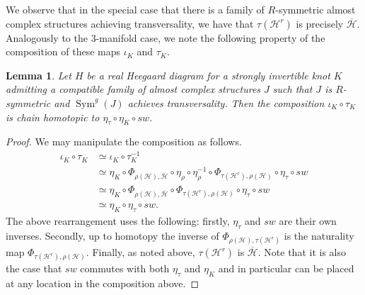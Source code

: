 \documentclass[11pt,reqno]{amsart}
\newtheorem{lem}[thm]{Lemma}
\theoremstyle{definition}
\theoremstyle{remark}
\DeclareMathOperator{\Sym}{{Sym}}
\newcommand{\cH}{\mathcal{H}}
\numberwithin{equation}{section}
\begin{document}
We observe that in the special case that there is a family of $R$-symmetric almost complex structures achieving transversality, we have that $\tau(\cH^r)$ is precisely $\overline{\cH}$. Analogously to the 3-manifold case, we note the following property of the composition of these maps $\iota_K$ and $\tau_K$. 
%
\begin{lem} \label{lem:iotaKtauK} Let $H$ be a real Heegaard diagram for a strongly invertible knot $K$ admitting a compatible family of almost complex structures $J$ such that $J$ is $R$-symmetric and $\Sym^g(J)$ achieves transversality. Then the composition $\iota_K \circ \tau_K$ is chain homotopic to $\eta_{\tau} \circ \eta_K \circ sw$. \end{lem}
\begin{proof} We may manipulate the composition as follows.
%
\begin{align*} 
\iota_K \circ \tau_K &\simeq \iota_K \circ \tau_K^{-1} \\
						&\simeq \eta_K \circ \Phi_{\rho(\cH), \overline{\cH}} \circ \eta_{\rho} \circ \eta_{\rho}^{-1} \circ \Phi_{\tau(\cH^r), \rho(\cH)} \circ \eta_{\tau} \circ sw \\
						&\simeq \eta_K \circ \Phi_{\rho(\cH), \overline{\cH}} \circ \Phi_{\tau(\cH^r), \rho(\cH)} \circ \eta_{\tau} \circ sw \\
						&\simeq \eta_K \circ \eta_{\tau} \circ sw.
\end{align*}
%
The above rearrangement uses the following: firstly, $\eta_{\tau}$ and $sw$ are their own inverses. Secondly, up to homotopy the inverse of $\Phi_{\rho(\cH), \tau(\cH^r)}$ is the naturality map $\Phi_{\tau(\cH^r), \rho(\cH)}$. Finally, as noted above, $\tau(\cH^r)$ is $\overline{\cH}$. Note that it is also the case that $sw$ commutes with both $\eta_{\tau}$ and $\eta_K$ and in particular can be placed at any location in the composition above.
\end{proof}
\end{document}
